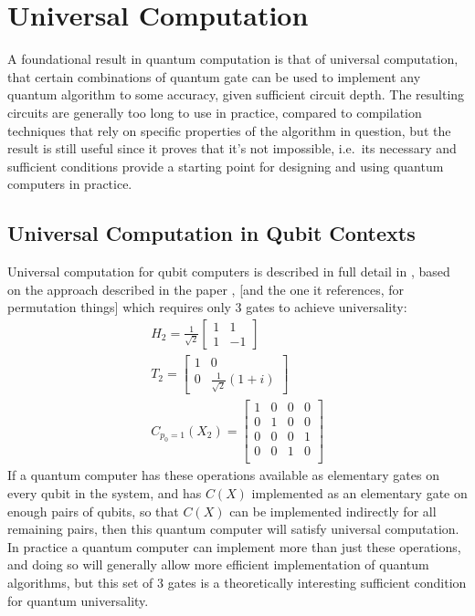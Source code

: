 \chapter[UNIVERSAL COMPUTATION]{Universal Computation}

A foundational result in quantum computation is that of universal computation, that certain combinations of quantum gate can be used to implement any quantum algorithm to some accuracy, given sufficient circuit depth. The resulting circuits are generally too long to use in practice, compared to compilation techniques that rely on specific properties of the algorithm in question, but the result is still useful since it proves that it's not impossible, i.e.\ its necessary and sufficient conditions provide a starting point for designing and using quantum computers in practice.

\section{Universal Computation in Qubit Contexts}
Universal computation for qubit computers is described in full detail in \cite{textbook}, based on the approach described in the paper \cite{universal-qubit}, [and the one it references, for permutation things] which requires only 3 gates to achieve universality:
\begin{align*}
	H_2 = \frac{1}{\sqrt{2}}\left[\begin{matrix}
		1 & 1 \\
		1 & -1
	\end{matrix}\right]
	\\
	T_2 = \left[\begin{matrix}
		1 & 0 \\
		0 & \frac{1}{\sqrt{2}}\left(1+ i\right)
	\end{matrix}\right]
	\\
	C_{p_0=1}(X_2) = \left[\begin{matrix}
		1 & 0 & 0 & 0 \\
		0 & 1 & 0 & 0 \\
		0 & 0 & 0 & 1 \\
		0 & 0 & 1 & 0 \\
	\end{matrix}\right]
\end{align*}
If a quantum computer has these operations available as elementary gates on every qubit in the system, and has $C(X)$ implemented as an elementary gate on enough pairs of qubits, so that $C(X)$ can be implemented indirectly for all remaining pairs, then this quantum computer will satisfy universal computation. In practice a quantum computer can implement more than just these operations, and doing so will generally allow more efficient implementation of quantum algorithms, but this set of 3 gates is a theoretically interesting sufficient condition for quantum universality.

